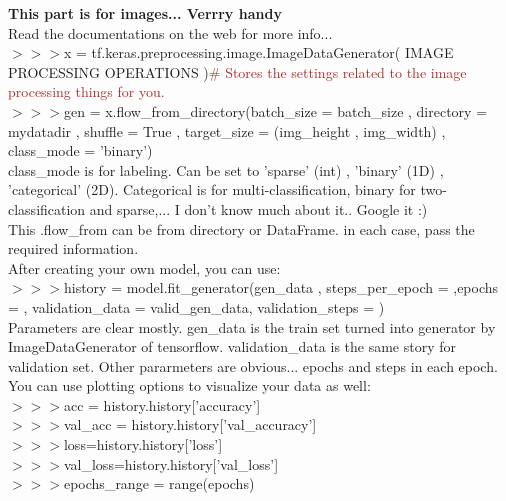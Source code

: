 \documentclass[a4paper,18pt]{article}
\begin{document}
{{{{{{{{{{{{{{{{{{{{{{{{{{\textbf{This part is for images... Verrry handy}\\

Read the documentations on the web for more info...\\

$>>>$x = tf.keras.preprocessing.image.ImageDataGenerator( IMAGE PROCESSING OPERATIONS ){\textcolor{brown}{\# Stores the settings related to the image processing things for you.}}\\

$>>>$gen = x.flow\_from\_directory(batch\_size = batch\_size , directory = mydatadir , shuffle = True , target\_size = (img\_height , img\_width) , class\_mode = 'binary')\\

class\_mode is for labeling. Can be set to 'sparse' (int) , 'binary' (1D) , 'categorical' (2D). Categorical is for multi-classification, binary for two-classification and sparse,... I don't know much about it.. Google it :)\\

This .flow\_from can be from directory or DataFrame. in each case, pass the required information.\\

After creating your own model, you can use:\\

$>>>$history = model.fit\_generator(gen\_data , steps\_per\_epoch = ,epochs = , validation\_data = valid\_gen\_data, validation\_steps = )\\ 

Parameters are clear mostly. gen\_data is the train set turned into generator by ImageDataGenerator of tensorflow. validation\_data is the same story for validation set. Other pararmeters are obvious... epochs and steps in each epoch.\\

You can use plotting options to visualize your data as well:\\

$>>>$acc = history.history['accuracy']\\

$>>>$val\_acc = history.history['val\_accuracy']\\

$>>>$loss=history.history['loss']\\

$>>>$val\_loss=history.history['val\_loss']\\

$>>>$epochs\_range = range(epochs)\\

}}}}}}}}}}}}}}}}}}}}}}}}}}
\end{document}
